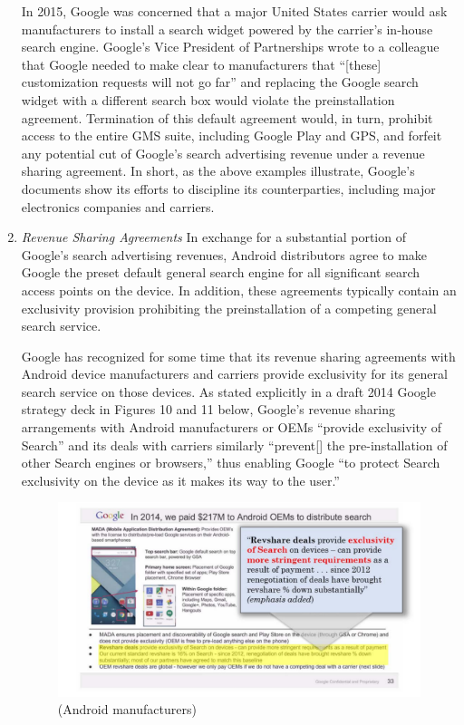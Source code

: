 \documentclass[11pt,b5paper,headings=small]{scrartcl}
\begin{document}
\begin{enumerate}

In 2015, Google was concerned that a major United States carrier would ask
manufacturers to install a search widget powered by the carrier’s in-house search engine.
Google’s Vice President of Partnerships wrote to a colleague that Google needed to make clear
to manufacturers that “[these] customization requests will not go far” and replacing the Google
search widget with a different search box would violate the preinstallation agreement.
Termination of this default agreement would, in turn, prohibit access to the entire GMS suite,
including Google Play and GPS, and forfeit any potential cut of Google’s search advertising
revenue under a revenue sharing agreement. In short, as the above examples illustrate, Google’s
documents show its efforts to discipline its counterparties, including major electronics companies
and carriers.


\item \textit{Revenue Sharing Agreements}\quad
In exchange for a substantial portion of Google’s search advertising revenues,
Android distributors agree to make Google the preset default general search engine for all
significant search access points on the device. In addition, these agreements typically contain an
exclusivity provision prohibiting the preinstallation of a competing general search service.


Google has recognized for some time that its revenue sharing agreements with
Android device manufacturers and carriers provide exclusivity for its general search service on
those devices. As stated explicitly in a draft 2014 Google strategy deck in Figures 10 and 11
below, Google’s revenue sharing arrangements with Android manufacturers or OEMs “provide
exclusivity of Search” and its deals with carriers similarly “prevent[] the pre-installation of other
Search engines or browsers,” thus enabling Google “to protect Search exclusivity on the device
as it makes its way to the user.”
\begin{figure}
\includegraphics{US-v-Google-Complaint-figures/fig10.PNG}
\caption{(Android manufacturers)}


\end{figure}
\end{enumerate}
\end{document}

